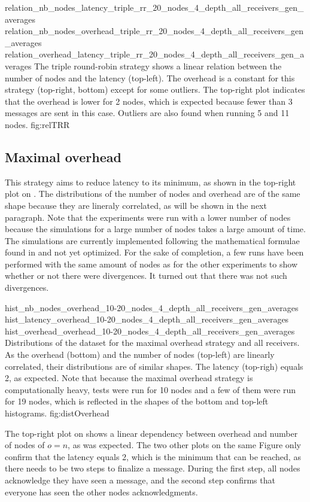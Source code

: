 \triplefigure
    {relation_nb_nodes_latency_triple_rr_20_nodes_4_depth_all_receivers_gen_averages}
    {relation_nb_nodes_overhead_triple_rr_20_nodes_4_depth_all_receivers_gen_averages}
    {relation_overhead_latency_triple_rr_20_nodes_4_depth_all_receivers_gen_averages}
    {The triple round-robin strategy shows a linear relation between the number of
    nodes and the latency (top-left). The overhead is a constant for this
    strategy (top-right, bottom) except for some outliers. The top-right plot
    indicates that the overhead is lower for 2 nodes, which is expected because
    fewer than 3 messages are sent in this case. Outliers are also found when
    running 5 and 11 nodes.}
    {fig:relTRR}

\FloatBarrier
\subsection{Maximal overhead}
This strategy aims to reduce latency to its minimum, as shown in the
top-right plot on . The distributions of the number
of nodes and overhead are of the same shape because they are lineraly
correlated, as will be shown in the next paragraph. 
Note that the experiments were run with a lower number of nodes because the
simulations for a large number of nodes takes a large amount of time. The
simulations are currently implemented following the mathematical formulae found
in \cite{abstractCBC} and not yet optimized. For the sake of completion, a few runs
have been performed with the same amount of nodes as for the other experiments
to show whether or not there were divergences. It turned out that there was not
such divergences. 

\triplefigure
    {hist_nb_nodes_overhead_10-20_nodes_4_depth_all_receivers_gen_averages}
    {hist_latency_overhead_10-20_nodes_4_depth_all_receivers_gen_averages}
    {hist_overhead_overhead_10-20_nodes_4_depth_all_receivers_gen_averages}
    {Distributions of the dataset for the maximal overhead strategy and all
    receivers. As the overhead (bottom) and the number of nodes (top-left) are
    linearly correlated, their distributions are of similar shapes. The
    latency (top-righ) equals 2, as expected. Note that because the maximal
    overhead strategy is computationally heavy, tests were run for 10 nodes and
    a few of them were run for 19 nodes, which is reflected in the shapes of the
    bottom and top-left histograms.}
    {fig:distOverhead}

The top-right plot on  shows a linear dependency between
overhead and number of nodes of \(o = n\), as was expected.  The two other plots
on the same Figure only confirm that the latency equals 2, which is the minimum
that can be reached, as there needs to be two steps to finalize a message.
During the first step, all nodes acknowledge they have seen a message, and the
second step confirms that everyone has seen the other nodes acknowledgments.


